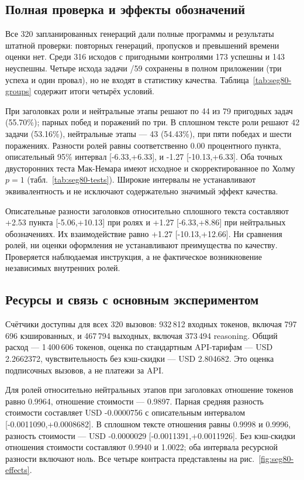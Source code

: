 \subsection{Полная проверка и эффекты обозначений}
Все 320 запланированных генераций дали полные программы и результаты штатной проверки: повторных генераций, пропусков и превышений времени оценки нет. Среди 316 исходов с пригодными контролями 173 успешны и 143 неуспешны. Четыре исхода задачи /59 сохранены в полном приложении (три успеха и один провал), но не входят в статистику качества. Таблица~\ref{tab:seg80-groups} содержит итоги четырёх условий.


При заголовках роли и нейтральные этапы решают по 44 из 79 пригодных задач (55.70\%); парных побед и поражений по три. В сплошном тексте роли решают 42 задачи (53.16\%), нейтральные этапы --- 43 (54.43\%), при пяти победах и шести поражениях. Разности ролей равны соответственно 0.00 процентного пункта, описательный 95\% интервал [-6.33,+6.33], и -1.27 [-10.13,+6.33]. Оба точных двусторонних теста Мак-Немара имеют исходное и скорректированное по Холму $p=1$ (табл.~\ref{tab:seg80-tests}). Широкие интервалы не устанавливают эквивалентность и не исключают содержательно значимый эффект качества.


Описательные разности заголовков относительно сплошного текста составляют +2.53 пункта [-5.06,+10.13] при ролях и +1.27 [-6.33,+8.86] при нейтральных обозначениях. Их взаимодействие равно +1.27 [-10.13,+12.66]. Ни сравнения ролей, ни оценки оформления не устанавливают преимущества по качеству. Проверяется наблюдаемая инструкция, а не фактическое возникновение независимых внутренних ролей.

\subsection{Ресурсы и связь с основным экспериментом}
Счётчики доступны для всех 320 вызовов: 932\,812 входных токенов, включая 797\,696 кэшированных, и 467\,794 выходных, включая 373\,494 reasoning. Общий расход --- 1\,400\,606 токенов, оценка по стандартным API-тарифам --- USD 2.2662372, чувствительность без кэш-скидки --- USD 2.804682. Это оценка подписочных вызовов, а не платежи за API.

Для ролей относительно нейтральных этапов при заголовках отношение токенов равно 0.9964, отношение стоимости --- 0.9897. Парная средняя разность стоимости составляет USD -0.0000756 с описательным интервалом [-0.0011090,+0.0008682]. В сплошном тексте отношения равны 0.9998 и 0.9996, разность стоимости --- USD -0.0000029 [-0.0011391,+0.0011926]. Без кэш-скидки отношения стоимости составляют 0.9940 и 1.0022; оба интервала ресурсной разности включают ноль. Все четыре контраста представлены на рис.~\ref{fig:seg80-effects}.


